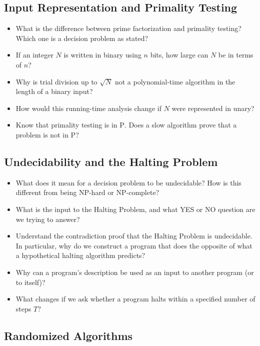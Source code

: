 \documentclass[11 pt]{exam}
\begin{document}
	\subsection{Input Representation and Primality Testing}

	\begin{itemize}
		\item What is the difference between prime factorization and primality testing? Which one is a decision problem as stated?
		\item If an integer $N$ is written in binary using $n$ bits, how large can $N$ be in terms of $n$?
		\item Why is trial division up to $\sqrt{N}$ not a polynomial-time algorithm in the length of a binary input?
		\item How would this running-time analysis change if $N$ were represented in unary?
		\item Know that primality testing is in $\mathrm{P}$. Does a slow algorithm prove that a problem is not in $\mathrm{P}$?
	\end{itemize}

	\subsection{Undecidability and the Halting Problem}

	\begin{itemize}
		\item What does it mean for a decision problem to be undecidable? How is this different from being $\mathrm{NP}$-hard or $\mathrm{NP}$-complete?
		\item What is the input to the Halting Problem, and what YES or NO question are we trying to answer?
		\item Understand the contradiction proof that the Halting Problem is undecidable. In particular, why do we construct a program that does the opposite of what a hypothetical halting algorithm predicts?
		\item Why can a program's description be used as an input to another program (or to itself)?
		\item What changes if we ask whether a program halts within a specified number of steps $T$?
	\end{itemize}

	\subsection{Randomized Algorithms}
\end{document}
